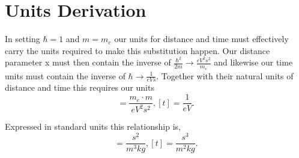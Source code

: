\documentclass[12pt, oneside]{article}
\begin{document}
	
\section*{Units Derivation}	
	In setting \(\hbar=1\) and \(m=m_e\) our units for distance and time must effectively carry the units required to make this substitution happen. Our distance parameter x must then contain the inverse of \(\frac{\hbar^2}{2m}\rightarrow\frac{eV^2 s^2}{m_e} \) and likewise our time units must contain the inverse of \(\hbar\rightarrow \frac{1}{eV s}\). Together with their natural units of distance and time this requires our units
	\begin{equation*}
	[x]=\frac{m_e\cdot m}{eV^2s^2}, [t]=\frac{1}{eV}.
	\end{equation*}
	
	Expressed in standard units this relationship is,
		\begin{equation*}
	[x]=\frac{s^2}{m^3kg}, [t]=\frac{s^3}{m^2kg}.
	\end{equation*}
	
\end{document}
